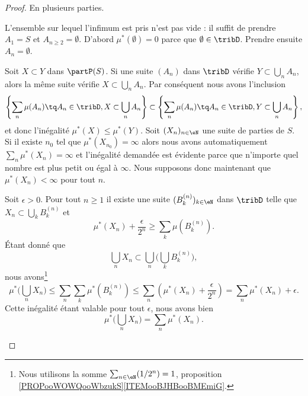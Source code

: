 \begin{proof}
	En plusieurs parties.
	\begin{subproof}
		L'ensemble sur lequel l'infimum est pris n'est pas vide : il suffit de prendre \( A_1=S\) et \( A_{n\geq 2}=\emptyset\).
		\spitem[Le vide]
		D'abord \( \mu^*(\emptyset)=0\) parce que \( \emptyset\in\tribD\). Prendre ensuite \( A_n=\emptyset\).

		Soit \( X\subset Y\) dans \( \partP(S)\). Si une suite \( (A_n)\) dans \( \tribD\) vérifie \( Y\subset \bigcup_nA_n\), alors la même suite vérifie \( X\subset\bigcup_nA_n\). Par conséquent nous avons l'inclusion
		\begin{equation}
			\left\{ \sum_n\mu(A_n)\tq A_n\in\tribD,X\subset\bigcup_nA_n \right\} \subset\left\{ \sum_n\mu(A_n)\tq A_n\in\tribD,Y\subset\bigcup_nA_n \right\} ,
		\end{equation}
		et donc l'inégalité \( \mu^*(X)\leq \mu^*(Y)\).
		Soit \( (X_n)_{n\in \eN}\) une suite de parties de \( S\). Si il existe \( n_0\) tel que \( \mu^*(X_{n_0})=\infty\) alors nous avons automatiquement \( \sum_n\mu^*(X_n)=\infty\) et l'inégalité demandée est évidente parce que n'importe quel nombre est plus petit ou égal à \( \infty\). Nous supposons donc maintenant que \( \mu^*(X_n)<\infty\) pour tout \( n\).

		Soit \( \epsilon>0\). Pour tout \( n\geq 1\) il existe une suite \( (B_k^{(n)})_{k\in \eN}\) dans \( \tribD\) telle que \( X_n\subset\bigcup_kB_k^{(n)}\) et
		\begin{equation}
			\mu^*(X_n)+\frac{ \epsilon }{ 2^n }\geq \sum_k\mu(B_k^{(n)}).
		\end{equation}
		Étant donné que
		\begin{equation}
			\bigcup_nX_n\subset\bigcup_n\big( \bigcup_kB_k^{(n)} \big),
		\end{equation}
		nous avons\footnote{Nous utilisons la somme \( \sum_{n\in \eN}(1/2^n)=1\), proposition \ref{PROPooWOWQooWbzukS}\ref{ITEMooBJHBooBMEmiG}.}
		\begin{equation}
			\mu^*\big( \bigcup_nX_n \big)\leq \sum_n\sum_k\mu^*(B_k^{(n)})\leq \sum_n\left( \mu^*(X_n)+\frac{ \epsilon }{ 2^n } \right)=\sum_n\mu^*(X_n)+\epsilon.
		\end{equation}
		Cette inégalité étant valable pour tout \( \epsilon\), nous avons bien
		\begin{equation}
			\mu^*\big( \bigcup_nX_n \big)=\sum_n\mu^*(X_n).
		\end{equation}


\end{subproof}
\end{proof}
